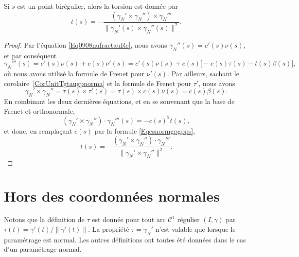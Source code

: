 \begin{proposition}
	Si \( s\) est un point birégulier, alors la torsion est donnée par
	\begin{equation}
		t(s)=-\frac{ (\gamma_N'\times \gamma_N'')\times \gamma_N''' }{ \| \gamma_N'(s)\times \gamma_N''(s) \|^2 }.
	\end{equation}
\end{proposition}

\begin{proof}
	Par l'équation \eqref{Eq0908nufractauRc}, nous avons \( \gamma_N''(s)=c'(s)\nu(s)\), et par conséquent
	\begin{equation}
		\gamma_N'''(s)=c'(s)\nu(s)+c(s)\nu'(s)=c'(s)\nu(s)+c(s)\big[ -c(s)\tau(s)-t(s)\beta(s) \big],
	\end{equation}
	où nous avons utilisé la formule de Frenet pour \( \nu'(s)\). Par ailleurs, sachant le corolaire~\ref{CorUnitTgtaugpnorma} et la formule de Frenet pour \( \tau'\), nous avons
	\begin{equation}
		\gamma_N'\times \gamma_N''=\tau(s)\times \tau'(s)=\tau(s)\times c(s)\nu(s)=c(s)\beta(s).
	\end{equation}
	En combinant les deux dernières équations, et en se souvenant que la base de Frenet et orthonormale,
	\begin{equation}
		(\gamma_N'\times \gamma_N'')\cdot \gamma_N'''(s)=-c(s)^2t(s),
	\end{equation}
	et donc, en remplaçant \( c(s)\) par la formule \eqref{Eqcsnormgpgpps},
	\begin{equation}
		t(s)=-\frac{  (\gamma_N'\times \gamma_N'')\cdot \gamma_N'''   }{ \| \gamma_N'\times \gamma_N'' \|^2 }.
	\end{equation}
\end{proof}

\section{Hors des coordonnées normales}

\begin{remark}      \label{Remfougnormoupad}
	Notons que la définition de \( \tau\) est donnée pour tout arc \( \mathcal{C}^1\) régulier \( (I,\gamma)\) par \( \tau(t)=\gamma'(t)/\| \gamma'(t) \|\). La propriété \( \tau=\gamma_N'\) n'est valable que lorsque le paramétrage est normal. Les autres définitions ont toutes été données dans le cas d'un paramétrage normal.
\end{remark}

